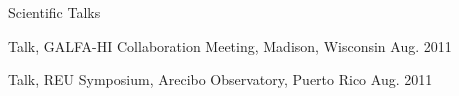 \documentclass{resume_clark} %
\begin{document}
\begin{rSection}{Scientific Talks}
\begin{etaremune}[itemsep=-1.8mm]
\item Talk, GALFA-HI Collaboration Meeting, Madison, Wisconsin \hfill {Aug. 2011}

\item Talk, REU Symposium, Arecibo Observatory, Puerto Rico \hfill {Aug. 2011}

\end{etaremune}



\end{rSection}





\end{document}
